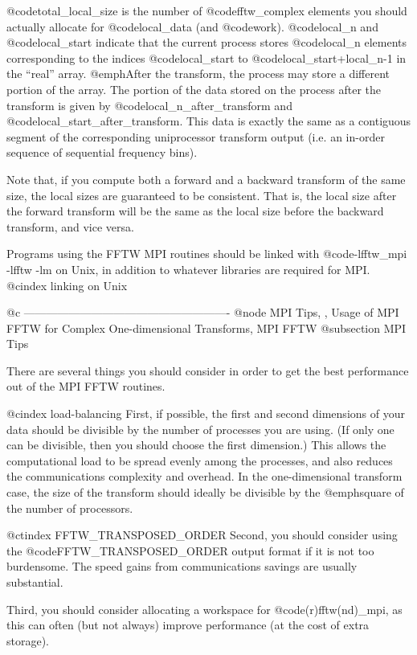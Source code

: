 @code{total_local_size} is the number of @code{fftw_complex} elements
you should actually allocate for @code{local_data} (and @code{work}).
@code{local_n} and @code{local_start} indicate that the current process
stores @code{local_n} elements corresponding to the indices
@code{local_start} to @code{local_start+local_n-1} in the ``real''
array.  @emph{After the transform, the process may store a different
portion of the array.}  The portion of the data stored on the process
after the transform is given by @code{local_n_after_transform} and
@code{local_start_after_transform}.  This data is exactly the same as a
contiguous segment of the corresponding uniprocessor transform output
(i.e. an in-order sequence of sequential frequency bins).

Note that, if you compute both a forward and a backward transform of the
same size, the local sizes are guaranteed to be consistent.  That is,
the local size after the forward transform will be the same as the local
size before the backward transform, and vice versa.

Programs using the FFTW MPI routines should be linked with
@code{-lfftw_mpi -lfftw -lm} on Unix, in addition to whatever libraries
are required for MPI.
@cindex linking on Unix

@c -------------------------------------------------------
@node MPI Tips,  , Usage of MPI FFTW for Complex One-dimensional Transforms, MPI FFTW
@subsection MPI Tips

There are several things you should consider in order to get the best
performance out of the MPI FFTW routines.

@cindex load-balancing
First, if possible, the first and second dimensions of your data should
be divisible by the number of processes you are using.  (If only one can
be divisible, then you should choose the first dimension.)  This allows
the computational load to be spread evenly among the processes, and also
reduces the communications complexity and overhead.  In the
one-dimensional transform case, the size of the transform should ideally
be divisible by the @emph{square} of the number of processors.

@ctindex FFTW_TRANSPOSED_ORDER
Second, you should consider using the @code{FFTW_TRANSPOSED_ORDER}
output format if it is not too burdensome.  The speed gains from
communications savings are usually substantial.

Third, you should consider allocating a workspace for
@code{(r)fftw(nd)_mpi}, as this can often
(but not always) improve performance (at the cost of extra storage).

